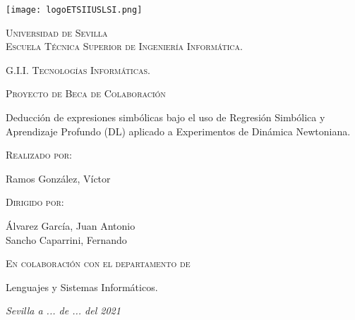 

\blankpage

\begin{titlepage}
\begin{center}
\texttt{[image: logoETSIIUSLSI.png]}

\vspace{1cm}

{\large \textsc{Universidad de Sevilla \\ Escuela Técnica Superior de Ingeniería Informática.}}

\vspace{0.5cm}

{\large \textsc{G.I.I. Tecnologías Informáticas.}}

\vspace{1cm}

{\Large \textsc{Proyecto de Beca de Colaboración}}

\vspace{1cm}


{\LARGE Deducción de expresiones simbólicas bajo el uso de Regresión Simbólica y Aprendizaje Profundo (DL) aplicado a Experimentos de Dinámica Newtoniana.}

\vspace{1cm}

{\large \textsc{Realizado por:}}

{\large Ramos González, Víctor}

\vspace{0.5cm}

{\large \textsc{Dirigido por:}}

{\large Álvarez García, Juan Antonio}\\
{\large Sancho Caparrini, Fernando}

\vspace{0.5cm}

{\large \textsc{En colaboración con el departamento de}}

{\large Lenguajes y Sistemas Informáticos.}
\end{center}

\vspace{1cm}
\begin{flushright}
\textit{Sevilla a ... de ... del 2021 \quad}
\end{flushright}
\end{titlepage}
